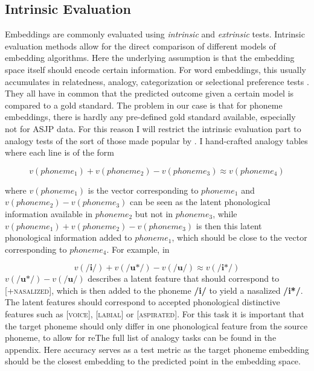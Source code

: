 \documentclass[11pt]{article}
\begin{document}
\subsection{Intrinsic Evaluation}
\label{Intrinsic Evaluation}

Embeddings are commonly evaluated using \textit{intrinsic} and \textit{extrinsic} tests.
Intrinsic evaluation methods allow for the direct comparison of different models of embedding algorithms. Here the underlying assumption is that the embedding space itself should encode certain information. For word embeddings, this usually accumulates in relatedness, analogy, categorization or selectional preference tests \cite{schnabel2015evaluation}. They all have in common that the predicted outcome given a certain model is compared to a gold standard. The problem in our case is that for phoneme embeddings, there is hardly any pre-defined gold standard available, especially not for ASJP data. For this reason I will restrict the intrinsic evaluation part to analogy tests of the sort of those made popular by \cite{mikolov2013distributed}. I hand-crafted analogy tables where each line is of the form 

\begin{equation}
v(phoneme_1) + v(phoneme_2) -  v(phoneme_3) \approx v(phoneme_4)
\end{equation}

where $v(phoneme_1)$ is the vector corresponding to $phoneme_1$ and $v(phoneme_2) - v(phoneme_3)$ can be seen as the latent phonological information available in $phoneme_2$ but not in $phoneme_3$,  while $v(phoneme_1) + v(phoneme_2) -  v(phoneme_3) $ is then this latent phonological information added to $phoneme_1$, which should be close to the vector corresponding to $phoneme_4$. For example, in

\begin{equation}
v(\textbf{/i/} ) + v(\textbf{/u*/} ) -  v(\textbf{/u/} ) \approx v(\textbf{/i*/} )
\end{equation}
$v(\textbf{/u*/} ) -  v(\textbf{/u/} )$ describes a latent feature that should correspond to \textsc{[+nasalized]}, which is then added to the phoneme \textbf{/i/} to yield a nasalized \textbf{/i*/}. The latent features should correspond to accepted phonological distinctive features such as \textsc{[voice]}, \textsc{[labial]} or \textsc{[aspirated]}. For this task it is important that the target phoneme should only differ in one phonological feature from the source phoneme, to allow for reThe full list of analogy tasks can be found in the appendix. 
Here accuracy serves as a test metric as the target phoneme embedding should be the closest embedding to the predicted point in the embedding space.
\end{document}
